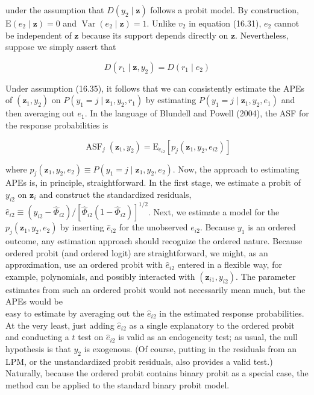 \documentclass[10pt]{article}
\begin{document}
under the assumption that $D\left(y_{2} \mid \mathbf{z}\right)$ follows a probit model. By construction, $\mathrm{E}\left(e_{2} \mid \mathbf{z}\right) =0$ and $\operatorname{Var}\left(e_{2} \mid \mathbf{z}\right)=1$. Unlike $v_{2}$ in equation (16.31), $e_{2}$ cannot be independent of $\mathbf{z}$ because its support depends directly on $\mathbf{z}$. Nevertheless, suppose we simply assert that


\begin{equation*}
D\left(r_{1} \mid \mathbf{z}, y_{2}\right)=D\left(r_{1} \mid e_{2}\right) \tag{16.35}
\end{equation*}


Under assumption (16.35), it follows that we can consistently estimate the APEs of $\left(\mathbf{z}_{1}, y_{2}\right)$ on $P\left(y_{1}=j \mid \mathbf{z}_{1}, y_{2}, r_{1}\right)$ by estimating $P\left(y_{1}=j \mid \mathbf{z}_{1}, y_{2}, e_{1}\right)$ and then averaging out $e_{1}$. In the language of Blundell and Powell (2004), the ASF for the response probabilities is


\begin{equation*}
\operatorname{ASF}_{j}\left(\mathbf{z}_{1}, y_{2}\right)=\mathrm{E}_{e_{i 2}}\left[p_{j}\left(\mathbf{z}_{1}, y_{2}, e_{i 2}\right)\right] \tag{16.36}
\end{equation*}


where $p_{j}\left(\mathbf{z}_{1}, y_{2}, e_{2}\right) \equiv P\left(y_{1}=j \mid \mathbf{z}_{1}, y_{2}, e_{2}\right)$. Now, the approach to estimating APEs is, in principle, straightforward. In the first stage, we estimate a probit of $y_{i 2}$ on $\mathbf{z}_{i}$ and construct the standardized residuals, $\hat{e}_{i 2} \equiv\left(y_{i 2}-\hat{\Phi}_{i 2}\right) /\left[\hat{\Phi}_{i 2}\left(1-\hat{\Phi}_{i 2}\right)\right]^{1 / 2}$. Next, we estimate a model for the $p_{j}\left(\mathbf{z}_{1}, y_{2}, e_{2}\right)$ by inserting $\hat{e}_{i 2}$ for the unobserved $e_{i 2}$. Because $y_{1}$ is an ordered outcome, any estimation approach should recognize the ordered nature. Because ordered probit (and ordered logit) are straightforward, we might, as an approximation, use an ordered probit with $\hat{e}_{i 2}$ entered in a flexible way, for example, polynomials, and possibly interacted with $\left(\mathbf{z}_{i 1}, y_{i 2}\right)$. The parameter estimates from such an ordered probit would not necessarily mean much, but the APEs would be\\
easy to estimate by averaging out the $\hat{e}_{i 2}$ in the estimated response probabilities. At the very least, just adding $\hat{e}_{i 2}$ as a single explanatory to the ordered probit and conducting a $t$ test on $\hat{e}_{i 2}$ is valid as an endogeneity test; as usual, the null hypothesis is that $y_{2}$ is exogenous. (Of course, putting in the residuals from an LPM, or the unstandardized probit residuals, also provides a valid test.) Naturally, because the ordered probit contains binary probit as a special case, the method can be applied to the standard binary probit model.
\end{document}
